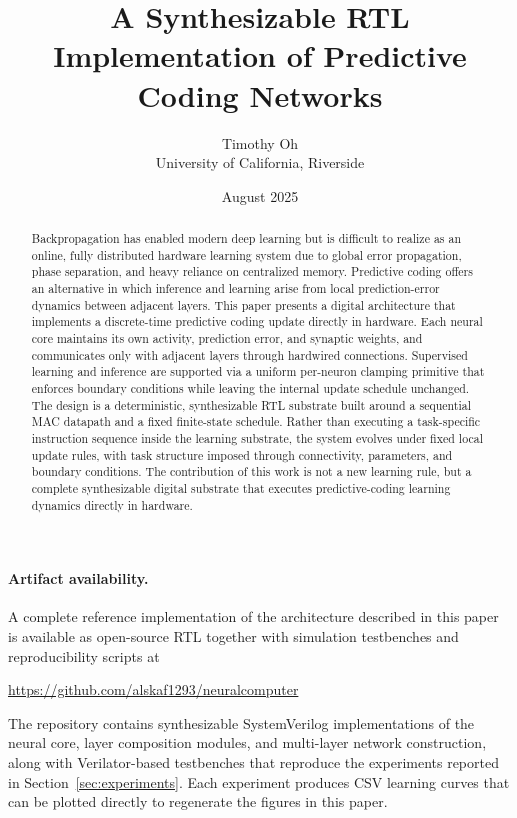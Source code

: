 \documentclass{article}
\title{A Synthesizable RTL Implementation of Predictive Coding Networks}
\author{
Timothy Oh \\
University of California, Riverside
}
\date{August 2025}
\begin{document}
\maketitle

\begin{abstract}
Backpropagation has enabled modern deep learning but is difficult to realize as an online, fully distributed hardware learning system due to global error propagation, phase separation, and heavy reliance on centralized memory. Predictive coding offers an alternative in which inference and learning arise from local prediction-error dynamics between adjacent layers. This paper presents a digital architecture that implements a discrete-time predictive coding update directly in hardware. Each neural core maintains its own activity, prediction error, and synaptic weights, and communicates only with adjacent layers through hardwired connections. Supervised learning and inference are supported via a uniform per-neuron clamping primitive that enforces boundary conditions while leaving the internal update schedule unchanged. The design is a deterministic, synthesizable RTL substrate built around a sequential MAC datapath and a fixed finite-state schedule. Rather than executing a task-specific instruction sequence inside the learning substrate, the system evolves under fixed local update rules, with task structure imposed through connectivity, parameters, and boundary conditions. The contribution of this work is not a new learning rule, but a complete synthesizable digital substrate that executes predictive-coding learning dynamics directly in hardware.
\end{abstract}

\paragraph{Artifact availability.}
A complete reference implementation of the architecture described in this paper
is available as open-source RTL together with simulation testbenches and
reproducibility scripts at

\begin{center}
\url{https://github.com/alskaf1293/neuralcomputer}
\end{center}

The repository contains synthesizable SystemVerilog implementations of the
neural core, layer composition modules, and multi-layer network construction,
along with Verilator-based testbenches that reproduce the experiments reported
in Section~\ref{sec:experiments}. Each experiment produces CSV learning curves
that can be plotted directly to regenerate the figures in this paper.
\end{document}
